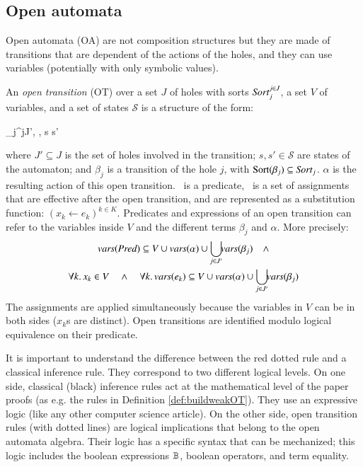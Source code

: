 \documentclass{elsarticle}
\newcommand{\TODO}[1]{\textcolor{red}{\textbf{[TODO:#1]}}}
\begin{document}
\subsection{Open automata}
 Open automata (OA) are not composition structures but they are made of transitions that are dependent of the actions of the holes, and they can use variables (potentially with only symbolic values). 
\begin{definition}\label{def:OT}
	\label{def:OpenTransitions}
	An \emph{open transition} (OT) over a
	set $J$ of holes with sorts $\Sort_j^{j\in J}$, a set $V$ of variables, and a set of states $\mathcal{S}$ is 
	a structure of the form:	
	\begin{mathpar}
	\openrule
	{	\beta_j^{j\in J'}, \Pred, \Post}
	{s \OTarrow {\alpha}s'}
	\end{mathpar}
	where $J'\subseteq J$ is the set of holes involved in the transition; $s, s'\in\mathcal{S}$ are states of the automaton; and $\beta_j$
        is a transition of the hole $j$, with $\Sortop(\beta_j)\subseteq\Sort_j$. $\alpha$  is the resulting action of this open transition.
        \Pred\ is a predicate, \Post\ is a set of 
	assignments that are effective after the open transition, and are
        represented as a substitution function: $({x_k\gets e_k})^{k\in K}$.
Predicates and expressions of an open transition can refer to the variables inside  $V$ and the different terms
        $\beta_j$ and $\alpha$. More precisely:
\begin{multline*}
 \vars(\Pred) \subseteq V\cup\vars(\alpha)\cup
			{\displaystyle \bigcup_{j\in J'}\!\!\vars(\beta_j)}\quad\land\\
\forall k.\, x_k\in V \quad\land\quad \forall k.\,\vars(e_k)\subseteq V\cup\vars(\alpha)\cup
			{\displaystyle \bigcup_{j\in J'}\!\!\vars(\beta_j)}
\end{multline*}
The assignments are applied simultaneously because the variables in $V$ can be in both sides ($x_k$s are distinct).
 Open transitions are identified
        modulo logical equivalence on their predicate. 
\end{definition}


It is important to understand the difference between the red dotted rule and a classical 
inference rule. They correspond to two different logical levels.
On one side, classical (black) inference rules act at the mathematical level of the paper proofs (as e.g. the rules in Definition \ref{def:buildweakOT}). They use  an expressive logic (like any other computer science article).
 On the other side, open transition rules (with dotted lines) are logical implications that belong to the open automata algebra.
Their  logic has a specific syntax  that can be mechanized; this logic includes the boolean expressions $\mathbb{B}$, boolean operators, and term equality.
\end{document}
